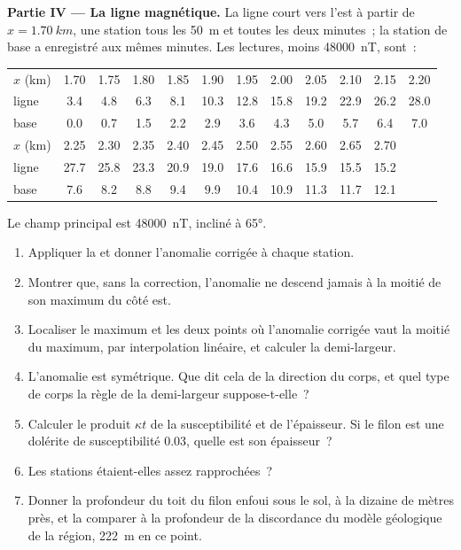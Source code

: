 \begin{problem}
\medskip\noindent\textbf{Partie IV --- La ligne magnétique.} La ligne court
vers l'est à partir de $x = \qty{1.70}{km}$, une station tous les \qty{50}{m} et
toutes les deux minutes~; la station de base a enregistré aux mêmes minutes. Les
lectures, moins \qty{48000}{nT}, sont~:
\begin{center}
\small
\setlength{\tabcolsep}{3.5pt}
\begin{tabular}{lccccccccccc}
\hline
$x$ (km) & 1.70 & 1.75 & 1.80 & 1.85 & 1.90 & 1.95 & 2.00 & 2.05 & 2.10 & 2.15 & 2.20 \\
ligne & 3.4 & 4.8 & 6.3 & 8.1 & 10.3 & 12.8 & 15.8 & 19.2 & 22.9 & 26.2 & 28.0 \\
base & 0.0 & 0.7 & 1.5 & 2.2 & 2.9 & 3.6 & 4.3 & 5.0 & 5.7 & 6.4 & 7.0 \\
\hline
$x$ (km) & 2.25 & 2.30 & 2.35 & 2.40 & 2.45 & 2.50 & 2.55 & 2.60 & 2.65 & 2.70 & \\
ligne & 27.7 & 25.8 & 23.3 & 20.9 & 19.0 & 17.6 & 16.6 & 15.9 & 15.5 & 15.2 & \\
base & 7.6 & 8.2 & 8.8 & 9.4 & 9.9 & 10.4 & 10.9 & 11.3 & 11.7 & 12.1 & \\
\hline
\end{tabular}
\end{center}
Le champ principal est \qty{48000}{nT}, incliné à \ang{65}.
\begin{enumerate}[resume]
\item Appliquer la  et donner l'anomalie corrigée à
  chaque station.
\item Montrer que, sans la correction, l'anomalie ne descend jamais à
  la moitié de son maximum du côté est.
\item Localiser le maximum et les deux points où l'anomalie corrigée vaut
  la moitié du maximum, par interpolation linéaire, et calculer la demi-largeur.
\item L'anomalie est symétrique. Que dit cela de la direction
  du corps, et quel type de corps la règle de la demi-largeur suppose-t-elle~?
\item Calculer le produit $\kappa t$ de la susceptibilité et de l'épaisseur.
  Si le filon est une dolérite de susceptibilité \num{0.03}, quelle
  est son épaisseur~?
\item Les stations étaient-elles assez rapprochées~?
\item Donner la profondeur du toit du filon enfoui sous le sol, à
  la dizaine de mètres près, et la comparer à la profondeur de la
  discordance du modèle géologique de la région, \qty{222}{m} en ce
  point.
\end{enumerate}
\end{problem}
